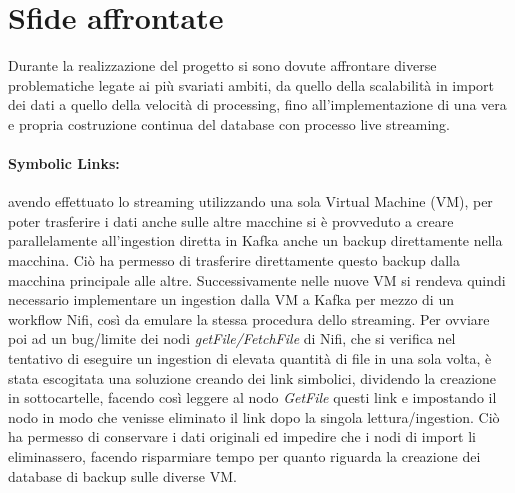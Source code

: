 \documentclass[fleqn,10pt]{SelfArx} %
\begin{document}
{\section{Sfide affrontate}


{\small
Durante la realizzazione del progetto si sono dovute affrontare diverse problematiche legate ai più svariati ambiti, da quello della scalabilità in import dei dati a quello della velocità di processing, fino all'implementazione di una vera e propria costruzione continua del database con processo live streaming.
\paragraph{Symbolic Links:} avendo effettuato lo streaming utilizzando una sola Virtual Machine (VM), per poter trasferire i dati anche sulle altre macchine si è provveduto a creare parallelamente all'ingestion diretta in Kafka anche un backup direttamente nella macchina. 
Ciò ha permesso di trasferire direttamente questo backup dalla macchina principale alle altre. 
Successivamente nelle nuove VM si rendeva quindi necessario implementare un ingestion dalla VM a Kafka per mezzo di un workflow Nifi, così da emulare la stessa procedura dello streaming. 
Per ovviare poi ad un bug/limite dei nodi \textit{getFile/FetchFile} di Nifi, che si verifica nel tentativo di eseguire un ingestion di elevata quantità di file in una sola volta, è stata escogitata una soluzione creando dei link simbolici, dividendo la creazione in sottocartelle, facendo così leggere al nodo \textit{GetFile} questi link e impostando il nodo in modo che venisse eliminato il link dopo la singola lettura/ingestion. Ciò ha permesso di conservare i dati originali ed impedire che i nodi di import li eliminassero, facendo risparmiare tempo per quanto riguarda la creazione dei database di backup sulle diverse VM.
}}
\end{document}

